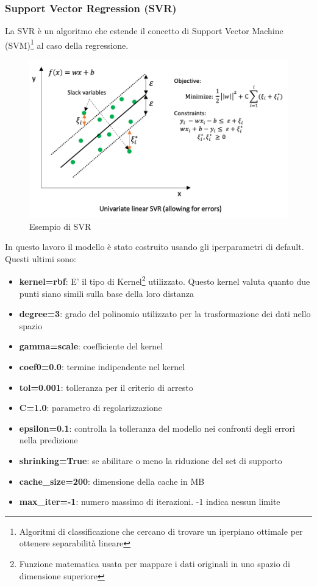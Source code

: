 \subsubsection{Support Vector Regression (SVR)}
La SVR è un algoritmo che estende il concetto di Support Vector Machine (SVM)\footnote{Algoritmi di classificazione che cercano di trovare un iperpiano ottimale per ottenere separabilità lineare}{} al caso della regressione.
\begin{figure}[H]
    \centering
    \includegraphics[scale=0.5]{images/SVR.png}
    \caption*{Esempio di SVR}
\end{figure} \newpage
\noindent In questo lavoro il modello è stato costruito usando gli iperparametri di default. Questi ultimi sono:
\begin{itemize}
    \item \textbf{kernel=rbf}: E' il tipo di Kernel\footnote{Funzione matematica usata per mappare i dati originali in uno spazio di dimensione superiore}{} utilizzato. Questo kernel valuta quanto due punti siano simili sulla base della loro distanza
    \item \textbf{degree=3}:  grado del polinomio utilizzato per la trasformazione dei dati nello spazio
    \item \textbf{gamma=scale}: coefficiente del kernel
    \item \textbf{coef0=0.0}: termine indipendente nel kernel
    \item \textbf{tol=0.001}: tolleranza per il criterio di arresto
    \item \textbf{C=1.0}: parametro di regolarizzazione
    \item \textbf{epsilon=0.1}:  controlla la tolleranza del modello nei confronti degli errori nella predizione
    \item \textbf{shrinking=True}: se abilitare o meno la riduzione del set di supporto
    \item \textbf{cache\_size=200}: dimensione della cache in MB
    \item \textbf{max\_iter=-1}: numero massimo di iterazioni. -1 indica nessun limite
\end{itemize}


